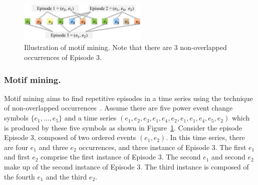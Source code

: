\begin{figure}[!hbtp]
        \centering
\includegraphics[width=0.55\textwidth]{disaggfigs/motifSample.png}
        \caption{Illustration of motif mining. Note that there are 3 non-overlapped
occurrences of Episode 3.}
        \label{fig_motifsample}
\end{figure}


\subsubsection*{Motif mining.} Motif mining aims to find repetitive
episodes in a time series using the technique of non-overlapped
occurrences~\cite{vatsan-paper}. Assume
there are five power event change symbols \begin{math} \{e_1, ..., e_5\} \end{math}
and a time series \begin{math} (e_1, e_2, e_3, e_1, e_4, e_2, e_1, e_1, e_4, e_5, e_2) \end{math}
which is produced by these five symbols as shown in Figure~\ref{fig_motifsample}.
Consider the episode Episode 3, composed of
two ordered events $(e_1, e_2)$.
In this time series, there are four \begin{math}e_1 \end{math} and
three \begin{math}e_2 \end{math} occurrences, and three instance of Episode 3.
The first \begin{math} e_1 \end{math} and first \begin{math} e_2 \end{math} comprise
the first instance of Episode 3.
The second \begin{math}e_1 \end{math} and second \begin{math}e_2 \end{math} make up
of the second instance of Episode 3.
The third instance is composed of the fourth \begin{math} e_1 \end{math} and
the third \begin{math} e_2 \end{math}.

